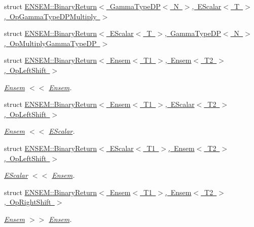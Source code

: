 \begin{DoxyCompactItemize}
\item 
struct \mbox{\hyperlink{structENSEM_1_1BinaryReturn_3_01GammaTypeDP_3_01N_01_4_00_01EScalar_3_01T_01_4_00_01OpGammaTypeDPMultiply_01_4}{E\+N\+S\+E\+M\+::\+Binary\+Return$<$ Gamma\+Type\+D\+P$<$ N $>$, E\+Scalar$<$ T $>$, Op\+Gamma\+Type\+D\+P\+Multiply $>$}}
\item 
struct \mbox{\hyperlink{structENSEM_1_1BinaryReturn_3_01EScalar_3_01T_01_4_00_01GammaTypeDP_3_01N_01_4_00_01OpMultiplyGammaTypeDP_01_4}{E\+N\+S\+E\+M\+::\+Binary\+Return$<$ E\+Scalar$<$ T $>$, Gamma\+Type\+D\+P$<$ N $>$, Op\+Multiply\+Gamma\+Type\+D\+P $>$}}
\item 
struct \mbox{\hyperlink{structENSEM_1_1BinaryReturn_3_01Ensem_3_01T1_01_4_00_01Ensem_3_01T2_01_4_00_01OpLeftShift_01_4}{E\+N\+S\+E\+M\+::\+Binary\+Return$<$ Ensem$<$ T1 $>$, Ensem$<$ T2 $>$, Op\+Left\+Shift $>$}}
\begin{DoxyCompactList}\small\item\em \mbox{\hyperlink{classENSEM_1_1Ensem}{Ensem}} $<$$<$ \mbox{\hyperlink{classENSEM_1_1Ensem}{Ensem}}. \end{DoxyCompactList}\item 
struct \mbox{\hyperlink{structENSEM_1_1BinaryReturn_3_01Ensem_3_01T1_01_4_00_01EScalar_3_01T2_01_4_00_01OpLeftShift_01_4}{E\+N\+S\+E\+M\+::\+Binary\+Return$<$ Ensem$<$ T1 $>$, E\+Scalar$<$ T2 $>$, Op\+Left\+Shift $>$}}
\begin{DoxyCompactList}\small\item\em \mbox{\hyperlink{classENSEM_1_1Ensem}{Ensem}} $<$$<$ \mbox{\hyperlink{classENSEM_1_1EScalar}{E\+Scalar}}. \end{DoxyCompactList}\item 
struct \mbox{\hyperlink{structENSEM_1_1BinaryReturn_3_01EScalar_3_01T1_01_4_00_01Ensem_3_01T2_01_4_00_01OpLeftShift_01_4}{E\+N\+S\+E\+M\+::\+Binary\+Return$<$ E\+Scalar$<$ T1 $>$, Ensem$<$ T2 $>$, Op\+Left\+Shift $>$}}
\begin{DoxyCompactList}\small\item\em \mbox{\hyperlink{classENSEM_1_1EScalar}{E\+Scalar}} $<$$<$ \mbox{\hyperlink{classENSEM_1_1Ensem}{Ensem}}. \end{DoxyCompactList}\item 
struct \mbox{\hyperlink{structENSEM_1_1BinaryReturn_3_01Ensem_3_01T1_01_4_00_01Ensem_3_01T2_01_4_00_01OpRightShift_01_4}{E\+N\+S\+E\+M\+::\+Binary\+Return$<$ Ensem$<$ T1 $>$, Ensem$<$ T2 $>$, Op\+Right\+Shift $>$}}
\begin{DoxyCompactList}\small\item\em \mbox{\hyperlink{classENSEM_1_1Ensem}{Ensem}} $>$$>$ \mbox{\hyperlink{classENSEM_1_1Ensem}{Ensem}}. \end{DoxyCompactList}\item 

\end{DoxyCompactItemize}
